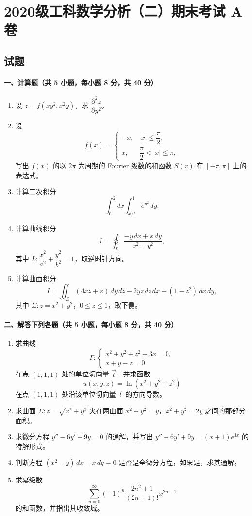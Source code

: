 \section{2020级工科数学分析（二）期末考试 A 卷}

\subsection{试题}

\paragraph*{一、计算题（共 5 小题，每小题 8 分，共 40 分）}
\begin{enumerate}
  \item 设 $z=f(xy^2,x^2y)$，求 $\dfrac{\partial^2 z}{\partial y^2}$。
  \item 设
  \[
    f(x)=
    \begin{cases}
      -x, & |x|\le \dfrac{\pi}{2},\\
      x, & \dfrac{\pi}{2}<|x|\le \pi,
    \end{cases}
  \]
  写出 $f(x)$ 的以 $2\pi$ 为周期的 Fourier 级数的和函数 $S(x)$ 在 $[-\pi,\pi]$ 上的表达式。
  \item 计算二次积分
  \[
    \int_0^2 dx\int_{x/2}^1 e^{y^2}\,dy.
  \]
  \item 计算曲线积分
  \[
    I=\oint_L\frac{-y\,dx+x\,dy}{x^2+y^2},
  \]
  其中 $L:\dfrac{x^2}{a^2}+\dfrac{y^2}{b^2}=1$，取逆时针方向。
  \item 计算曲面积分
  \[
    I=\iint_\Sigma (4xz+x)\,dy\,dz-2yz\,dz\,dx+(1-z^2)\,dx\,dy,
  \]
  其中 $\Sigma:z=x^2+y^2$，$0\le z\le 1$，取下侧。
\end{enumerate}

\paragraph*{二、解答下列各题（共 5 小题，每小题 8 分，共 40 分）}
\begin{enumerate}
  \item 求曲线
  \[
    \Gamma:
    \begin{cases}
      x^2+y^2+z^2-3x=0,\\
      x+y-z=0
    \end{cases}
  \]
  在点 $(1,1,1)$ 处的单位切向量 $\vec t$，并求函数
  \[
    u(x,y,z)=\ln(x^2+y^2+z^2)
  \]
  在点 $(1,1,1)$ 处沿该单位切向量 $\vec t$ 的方向导数。
  \item 求曲面 $\Sigma:z=\sqrt{x^2+y^2}$ 夹在两曲面 $x^2+y^2=y$，$x^2+y^2=2y$ 之间的那部分面积。
  \item 求微分方程 $y''-6y'+9y=0$ 的通解，并写出 $y''-6y'+9y=(x+1)e^{3x}$ 的特解形式。
  \item 判断方程 $(x^2-y)\,dx-x\,dy=0$ 是否是全微分方程，如果是，求其通解。
  \item 求幂级数
  \[
    \sum_{n=0}^{\infty}(-1)^n\frac{2n^2+1}{(2n+1)!}x^{2n+1}
  \]
  的和函数，并指出其收敛域。
\end{enumerate}

